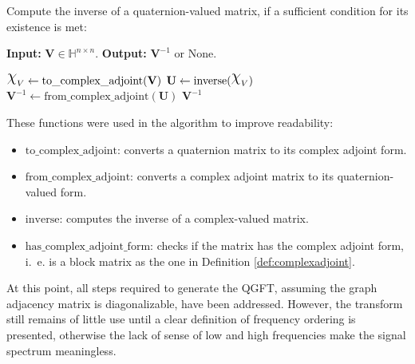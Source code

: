 \newcommand{\algorithmspacing}{0.5}
\begin{algorithm}
\label{alg:qinv}
Compute the inverse of a quaternion-valued matrix, if a sufficient condition for its existence is met:
\vspace*{-\algorithmspacing\baselineskip}
\begin{leftbar}
\noindent\textbf{\upshape Input:} $\mathbf{V} \in \mathbb{H}^{n \times n}$. \textbf{\upshape Output:} $\mathbf{V}^{-1}$ or {\upshape None}.

\begin{algorithmic}[1]
\State $\rchi_V \gets \mathrm{to\_complex\_adjoint}(\mathbf{V})$
    \State {}
\Else
    \State $\mathbf{U} \gets \mathrm{inverse}(\rchi_V)$
        \State {}
    \Else
        \State $\mathbf{V}^{-1} \gets \mathrm{from\_complex\_adjoint}(\mathbf{U})$
        \State \Return $\mathbf{V}^{-1}$
    \EndIf
\EndIf
\end{algorithmic}
\end{leftbar}
\vspace*{-\algorithmspacing\baselineskip}
\noindent These functions were used in the algorithm to improve readability:
\vspace*{-\algorithmspacing\baselineskip}
\begin{itemize}[noitemsep]
\item $\mathrm{to\_complex\_adjoint}$: converts a quaternion matrix to its complex adjoint form.
\item $\mathrm{from\_complex\_adjoint}$: converts a complex adjoint matrix to its quaternion-valued form.
\item $\mathrm{inverse}$: computes the inverse of a complex-valued matrix.
\item $\mathrm{has\_complex\_adjoint\_form}$: checks if the matrix has the complex adjoint form, i.~e. is a block matrix as the one in Definition \ref{def:complexadjoint}.
\end{itemize}
\end{algorithm}

At this point, all steps required to generate the QGFT, assuming the graph adjacency matrix is diagonalizable, have been addressed. However, the transform still remains of little use until a clear definition of frequency ordering is presented, otherwise the lack of sense of low and high frequencies make the signal spectrum meaningless.

